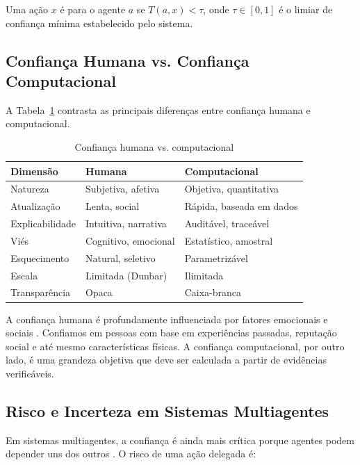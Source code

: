 \begin{definicao}
Uma ação $x$ é  para o agente $a$ se
$T(a, x) < \tau$, onde $\tau \in [0,1]$ é o limiar de confiança
mínima estabelecido pelo sistema.
\end{definicao}

\subsection{Confiança Humana vs. Confiança Computacional}

A Tabela~\ref{tab:confianca-humana-computacional} contrasta as
principais diferenças entre confiança humana e computacional.

\begin{table}[htb]
\centering
\caption{Confiança humana vs. computacional}
\label{tab:confianca-humana-computacional}
\begin{tabular}{lll}
\toprule
\textbf{Dimensão} & \textbf{Humana} & \textbf{Computacional} \\
\midrule
Natureza & Subjetiva, afetiva & Objetiva, quantitativa \\
Atualização & Lenta, social & Rápida, baseada em dados \\
Explicabilidade & Intuitiva, narrativa & Auditável, traceável \\
Viés & Cognitivo, emocional & Estatístico, amostral \\
Esquecimento & Natural, seletivo & Parametrizável \\
Escala & Limitada (Dunbar) & Ilimitada \\
Transparência & Opaca & Caixa-branca \\
\bottomrule
\end{tabular}
\end{table}

A confiança humana é profundamente influenciada por fatores emocionais
e sociais \cite{kahneman2003perspective}. Confiamos em pessoas com base
em experiências passadas, reputação social e até mesmo características
físicas. A confiança computacional, por outro lado, é uma grandeza
objetiva que deve ser calculada a partir de evidências verificáveis.

\subsection{Risco e Incerteza em Sistemas Multiagentes}

Em sistemas multiagentes, a confiança é ainda mais crítica porque
agentes podem depender uns dos outros \cite{wooldridge2009multiagent,
weiss2013multiagent}. O risco de uma ação delegada é:

